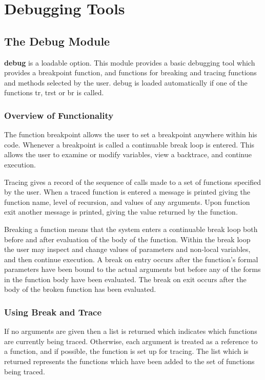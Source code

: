 \chapter*{Debugging Tools}

\section{The Debug Module}

 {\bf debug} is a loadable  option.   This module provides a
basic debugging tool which provides a breakpoint  function,  and
functions   for  breaking  and  tracing  functions  and  methods
selected by the user.  debug is loaded automatically if one of the
functions tr, trst or br is called.

\subsection{Overview of Functionality}

  The function breakpoint allows the user to  set  a  breakpoint
anywhere  within  his  code.   Whenever a breakpoint is called a
continuable break loop is entered.   This  allows  the  user  to
examine  or  modify  variables,  view  a backtrace, and continue
execution.

  Tracing gives a record of the sequence of calls made to a  set
of  functions  specified by the user.  When a traced function is
entered a message is printed giving the function name, level  of
recursion,  and  values  of  any  arguments.  Upon function exit
another message is printed, giving the  value  returned  by  the
function.

  Breaking a function means that the system enters a continuable
break  loop  both before and after evaluation of the body of the
function.  Within the break loop the user may inspect and change
values of parameters and non-local variables, and then  continue
execution.   A break on entry occurs after the function's formal
parameters have been bound to the actual  arguments  but  before
any  of the forms in the function body have been evaluated.  The
break on exit occurs after the body of the broken  function  has
been evaluated.

\subsection{Using Break and Trace}


{    If  no  arguments  are  given  then a list is returned which
    indicates  which  functions  are  currently  being   traced.
    Otherwise,  each  argument  is  treated  as a reference to a
    function, and if  possible,  the  function  is  set  up  for
    tracing.    The   list  which  is  returned  represents  the
    functions which have been added  to  the  set  of  functions
    being  traced.   
}

